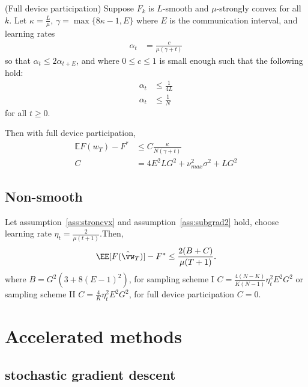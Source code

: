 \begin{theorem}
	(Full device participation) Suppose $F_{k}$ is $L$-smooth and $\mu$-strongly
	convex for all $k$. Let $\kappa=\frac{L}{\mu}$, $\gamma=\max\{8\kappa-1,E\}$
	where $E$ is the communication interval, and learning rates 
	\begin{align*}
	\alpha_{t} & =\frac{c}{\mu(\gamma+t)}
	\end{align*}
	so that $\alpha_{t}\leq2\alpha_{t+E}$, and where $0\leq c\leq1$
	is small enough such that the following hold: 
	\begin{align*}
	\alpha_{t} & \leq\frac{1}{4L}\\
	\alpha_{t} & \leq\frac{1}{N}
	\end{align*}
	for all $t\geq0$. 
	
	Then with full device participation,
	\begin{align*}
	\mathbb{E}F(w_{T})-F^{\ast} & \leq C\frac{\kappa}{N(\gamma+t)}\\
	C & =4E^{2}LG^{2}+\nu_{max}^{2}\sigma^{2}+LG^{2}
	\end{align*}
	
\end{theorem}

\subsection{Non-smooth}
\begin{theorem}
	Let assumption~\ref{ass:stroncvx} and assumption~\ref{ass:subgrad2} hold, choose learning rate $\eta_t = \frac{2}{\mu(t+1)} $.Then,
	\begin{align}
		\EE[F(\hat{\vw}_T)] - F^* \leq \frac{2(B + C)}{\mu(T+1)}.
	\end{align}
	where $B =  G^2 (3  + 8 (E-1)^2)$, for sampling scheme I $C =\frac{4(N - K)}{K(N-1)} \eta_t^2 E^2G^2 $ or
sampling scheme II $C = \frac{4}{K} \eta_t^2 E^2G^2$, for full device participation $C= 0$.
\end{theorem}


\section{Accelerated methods}
\subsection{stochastic gradient descent}
